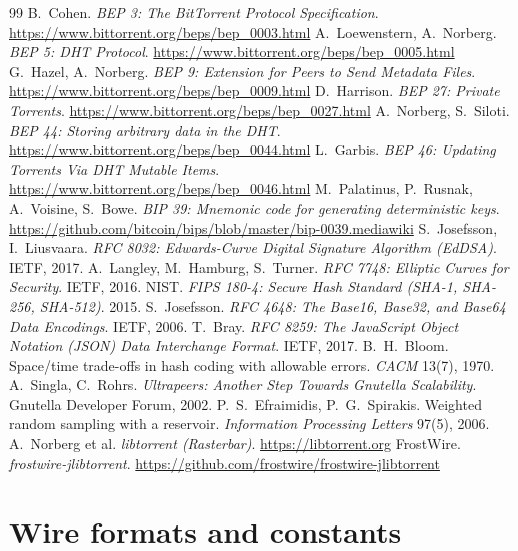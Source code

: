 \documentclass[11pt,a4paper]{article}
\DeclareRobustCommand{\_}{\origunderscore\allowbreak}
\begin{document}
\begin{thebibliography}{99}
 B.~Cohen. \emph{BEP 3: The BitTorrent Protocol Specification}. \url{https://www.bittorrent.org/beps/bep_0003.html}
 A.~Loewenstern, A.~Norberg. \emph{BEP 5: DHT Protocol}. \url{https://www.bittorrent.org/beps/bep_0005.html}
 G.~Hazel, A.~Norberg. \emph{BEP 9: Extension for Peers to Send Metadata Files}. \url{https://www.bittorrent.org/beps/bep_0009.html}
 D.~Harrison. \emph{BEP 27: Private Torrents}. \url{https://www.bittorrent.org/beps/bep_0027.html}
 A.~Norberg, S.~Siloti. \emph{BEP 44: Storing arbitrary data in the DHT}. \url{https://www.bittorrent.org/beps/bep_0044.html}
 L.~Garbis. \emph{BEP 46: Updating Torrents Via DHT Mutable Items}. \url{https://www.bittorrent.org/beps/bep_0046.html}
 M.~Palatinus, P.~Rusnak, A.~Voisine, S.~Bowe. \emph{BIP 39: Mnemonic code for generating deterministic keys}. \url{https://github.com/bitcoin/bips/blob/master/bip-0039.mediawiki}
 S.~Josefsson, I.~Liusvaara. \emph{RFC 8032: Edwards-Curve Digital Signature Algorithm (EdDSA)}. IETF, 2017.
 A.~Langley, M.~Hamburg, S.~Turner. \emph{RFC 7748: Elliptic Curves for Security}. IETF, 2016.
 NIST. \emph{FIPS 180-4: Secure Hash Standard (SHA-1, SHA-256, SHA-512)}. 2015.
 S.~Josefsson. \emph{RFC 4648: The Base16, Base32, and Base64 Data Encodings}. IETF, 2006.
 T.~Bray. \emph{RFC 8259: The JavaScript Object Notation (JSON) Data Interchange Format}. IETF, 2017.
 B.~H.~Bloom. Space/time trade-offs in hash coding with allowable errors. \emph{CACM} 13(7), 1970.
 A.~Singla, C.~Rohrs. \emph{Ultrapeers: Another Step Towards Gnutella Scalability}. Gnutella Developer Forum, 2002.
 P.~S.~Efraimidis, P.~G.~Spirakis. Weighted random sampling with a reservoir. \emph{Information Processing Letters} 97(5), 2006.
 A.~Norberg et al. \emph{libtorrent (Rasterbar)}. \url{https://libtorrent.org}
 FrostWire. \emph{frostwire-jlibtorrent}. \url{https://github.com/frostwire/frostwire-jlibtorrent}
\end{thebibliography}

\clearpage
\appendix
\section{Wire formats and constants}
\label{app:constants}
\end{document}
